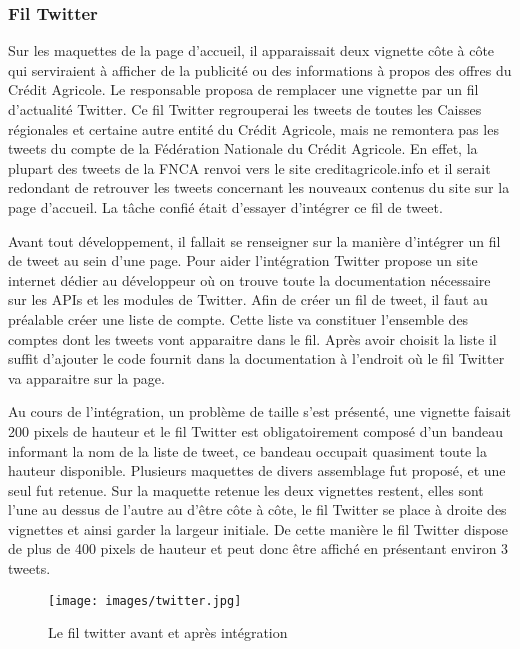 \documentclass[12pt,a4paper]{article}
\begin{document}
\subsubsection{Fil Twitter}
Sur les maquettes de la page d'accueil, il apparaissait deux vignette côte à côte qui serviraient à afficher de la publicité ou des informations à propos des offres du Crédit Agricole. Le responsable proposa de remplacer une vignette par un fil d'actualité Twitter. Ce fil Twitter regrouperai les tweets de toutes les Caisses régionales et certaine autre entité du Crédit Agricole, mais ne remontera pas les tweets du compte de la Fédération Nationale du Crédit Agricole. En effet, la plupart des tweets de la FNCA renvoi vers le site creditagricole.info et il serait redondant de retrouver les tweets concernant les nouveaux contenus du site sur la page d'accueil. La tâche confié était d'essayer d'intégrer ce fil de tweet.\par
\medskip
Avant tout développement, il fallait se renseigner sur la manière d'intégrer un fil de tweet au sein d'une page. Pour aider l'intégration Twitter propose un site internet dédier au développeur où on trouve toute la documentation nécessaire sur les APIs et les modules de Twitter. Afin de créer un fil de tweet, il faut au préalable créer une liste de compte. Cette liste va constituer l'ensemble des comptes dont les tweets vont apparaitre dans le fil. Après avoir choisit la liste il suffit d'ajouter le code fournit dans la documentation à l'endroit où le fil Twitter va apparaitre sur la page.\par
\medskip
Au cours de l'intégration, un problème de taille s'est présenté, une vignette faisait 200 pixels de hauteur et le fil Twitter est obligatoirement composé d'un bandeau informant la nom de la liste de tweet, ce bandeau occupait quasiment toute la hauteur disponible. Plusieurs maquettes de divers assemblage fut proposé, et une seul fut retenue. Sur la maquette retenue les deux vignettes restent, elles sont l'une au dessus de l'autre au d'être côte à côte, le fil Twitter se place à droite des vignettes et ainsi garder la largeur initiale. De cette manière le fil Twitter dispose de plus de 400 pixels de hauteur et peut donc être affiché en présentant environ 3 tweets.\par 

\begin{figure}[h!]
\centering\texttt{[image: images/twitter.jpg]} 
\caption{Le fil twitter avant et après intégration}
\end{figure}
\newpage
\end{document}

